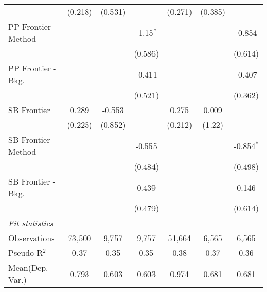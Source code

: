 \begin{tabular}{lcccccc}
                        & (0.218) & (0.531)       &             & (0.271) & (0.385)       &   \\   
   PP Frontier - Method &         &               & -1.15$^{*}$ &         &               & -0.854\\   
                        &         &               & (0.586)     &         &               & (0.614)\\   
   PP Frontier - Bkg.   &         &               & -0.411      &         &               & -0.407\\   
                        &         &               & (0.521)     &         &               & (0.362)\\   
   SB Frontier          & 0.289   & -0.553        &             & 0.275   & 0.009         &   \\   
                        & (0.225) & (0.852)       &             & (0.212) & (1.22)        &   \\   
   SB Frontier - Method &         &               & -0.555      &         &               & -0.854$^{*}$\\   
                        &         &               & (0.484)     &         &               & (0.498)\\   
   SB Frontier - Bkg.   &         &               & 0.439       &         &               & 0.146\\   
                        &         &               & (0.479)     &         &               & (0.614)\\   
   \midrule
   \emph{Fit statistics}\\
   Observations         & 73,500  & 9,757         & 9,757       & 51,664  & 6,565         & 6,565\\  
   Pseudo R$^2$         & 0.37    & 0.35          & 0.35        & 0.38    & 0.37          & 0.36\\  
Mean(Dep. Var.) & 0.793 & 0.603 & 0.603 & 0.974 & 0.681 & 0.681 \\
   

\end{tabular}
